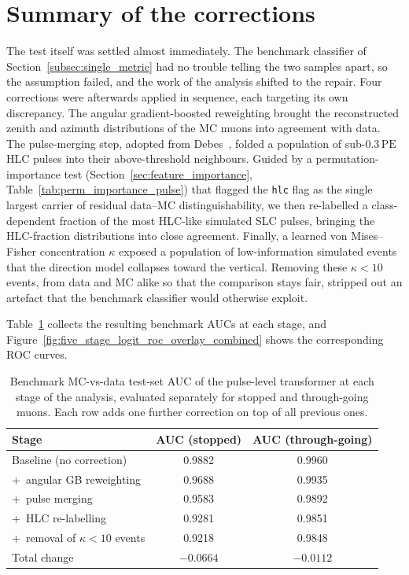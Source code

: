 \section{Summary of the corrections}

The test itself was settled almost immediately. The benchmark classifier of
Section~\ref{subsec:single_metric} had no trouble telling the two samples apart,
so the assumption failed, and the work of the analysis shifted to the repair. Four corrections were afterwards applied in sequence, each
targeting its own discrepancy. The angular gradient-boosted reweighting
brought the reconstructed zenith and azimuth distributions of the MC muons into
agreement with data.
The pulse-merging step, adopted from Debes~\cite{simon}, folded a population of
sub-$0.3\,\mathrm{PE}$ HLC pulses into their above-threshold neighbours. Guided by a permutation-importance test
(Section~\ref{sec:feature_importance}, Table~\ref{tab:perm_importance_pulse})
that flagged the \texttt{hlc} flag as the single largest carrier of residual
data--MC distinguishability, we then re-labelled a class-dependent fraction of
the most HLC-like simulated SLC pulses, bringing the HLC-fraction distributions
into close agreement. Finally, a learned von Mises--Fisher concentration $\kappa$
exposed a population of low-information simulated events that the direction model
collapses toward the vertical. Removing these $\kappa<10$ events, from data and
MC alike so that the comparison stays fair, stripped out an artefact that the
benchmark classifier would otherwise exploit.

Table~\ref{tab:auc_summary} collects the resulting benchmark AUCs at each stage,
and Figure~\ref{fig:five_stage_logit_roc_overlay_combined} shows the
corresponding ROC curves.

\begin{table}[H]
\centering
\begin{tabular}{lcc}
\toprule
Stage & AUC (stopped) & AUC (through-going) \\
\midrule
Baseline (no correction)        & 0.9882 & 0.9960 \\
\;+\ angular GB reweighting       & 0.9688 & 0.9935 \\
\;+\ pulse merging                & 0.9583 & 0.9892 \\
\;+\ HLC re-labelling             & 0.9281 & 0.9851 \\
\;+\ removal of $\kappa<10$ events & 0.9218 & 0.9848 \\
\midrule
Total change                    & $-0.0664$ & $-0.0112$ \\
\bottomrule
\end{tabular}
\caption{Benchmark MC-vs-data test-set AUC of the pulse-level transformer at
each stage of the analysis, evaluated separately for stopped and through-going
muons. Each row adds one further correction on top of all previous ones.}
\label{tab:auc_summary}
\end{table}

